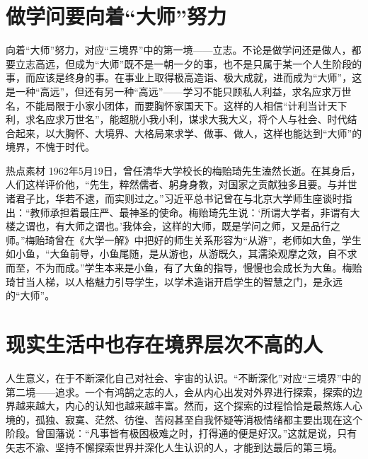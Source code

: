 \clearpage
\section*{做学问要向着“大师”努力}

向着“大师”努力，对应“三境界”中的第一境——立志。不论是做学问还是做人，都要立志高远，但成为“大师”既不是一朝一夕的事，也不是只属于某一个人生阶段的事，而应该是终身的事。在事业上取得极高造诣、极大成就，进而成为“大师”，这是一种“高远”，但还有另一种“高远”——学习不能只顾私人利益，求名应求万世名，不能局限于小家小团体，而要胸怀家国天下。这样的人相信“计利当计天下利，求名应求万世名”，能超脱小我小利，谋求大我大义，将个人与社会、时代结合起来，以大胸怀、大境界、大格局来求学、做事、做人，这样也能达到“大师”的境界，不愧于时代。

\begin{quoteBox}{热点素材}
1962年5月19日，曾任清华大学校长的梅贻琦先生溘然长逝。在其身后，人们这样评价他，“先生，粹然儒者、躬身身教，对国家之贡献独多且要。与并世诸君子比，华若不逮，而实则过之。”习近平总书记曾在与北京大学师生座谈时指出：“教师承担着最庄严、最神圣的使命。梅贻琦先生说：‘所谓大学者，非谓有大楼之谓也，有大师之谓也。’我体会，这样的大师，既是学问之师，又是品行之师。”梅贻琦曾在《大学一解》中把好的师生关系形容为“从游”，老师如大鱼，学生如小鱼，“大鱼前导，小鱼尾随，是从游也，从游既久，其濡染观摩之效，自不求而至，不为而成。”学生本来是小鱼，有了大鱼的指导，慢慢也会成长为大鱼。梅贻琦甘当人梯，以人格魅力引导学生，以学术造诣开启学生的智慧之门，是永远的“大师”。
\end{quoteBox}

\clearpage
\section*{现实生活中也存在境界层次不高的人}

人生意义，在于不断深化自己对社会、宇宙的认识。“不断深化”对应“三境界”中的第二境——追求。一个有鸿鹄之志的人，会从内心出发对外界进行探索，探索的边界越来越大，内心的认知也越来越丰富。然而，这个探索的过程恰恰是最熬炼人心境的，孤独、寂寞、茫然、彷徨、苦闷甚至自我怀疑等消极情绪都主要出现在这个阶段。曾国藩说：“凡事皆有极困极难之时，打得通的便是好汉。”这就是说，只有矢志不渝、坚持不懈探索世界并深化人生认识的人，才能到达最后的第三境。

